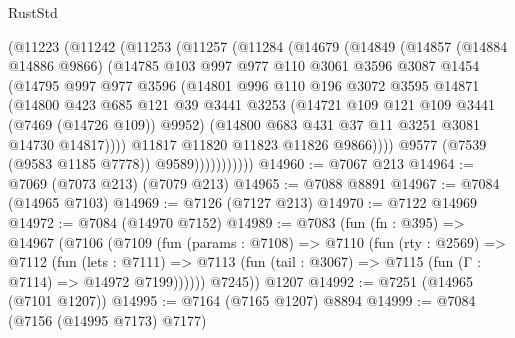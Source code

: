 \begin{lexlean}{RustStd}
\begin{coremodule}
                (@11223
                  (@11242
                    (@11253
                      (@11257
                        (@11284
                          (@14679
                            (@14849
                              (@14857
                                (@14884 @14886 @9866)
                                (@14785
                                  @103
                                  @997
                                  @977
                                  @110
                                  @3061
                                  @3596
                                  @3087
                                  @1454
                                  (@14795
                                    @997
                                    @977
                                    @3596
                                    (@14801
                                      @996
                                      @110
                                      @196
                                      @3072
                                      @3595
                                      @14871
                                      (@14800
                                        @423
                                        @685
                                        @121
                                        @39
                                        @3441
                                        @3253
                                        (@14721 @109 @121 @109 @3441 (@7469 (@14726 @109)) @9952)
                                        (@14800 @683 @431 @37 @11 @3251 @3081 @14730 @14817))))
                                  @11817
                                  @11820
                                  @11823
                                  @11826
                                  @9866))))
                          @9577
                          (@7539 (@9583 @1185 @7778))
                          @9589)))))))))))
@14960 := @7067 @213
@14964 := @7069 (@7073 @213) (@7079 @213)
@14965 := @7088 @8891
@14967 := @7084 (@14965 @7103)
@14969 := @7126 (@7127 @213)
@14970 := @7122 @14969
@14972 := @7084 (@14970 @7152)
@14989 := @7083
    (fun (fn : @395) =>
    @14967
      (@7106
        (@7109
          (fun (params : @7108) =>
          @7110
            (fun (rty : @2569) =>
            @7112
              (fun (lets : @7111) =>
              @7113 (fun (tail : @3067) => @7115 (fun (Γ : @7114) => @14972 @7199))))))
        @7245))
    @1207
@14992 := @7251 (@14965 (@7101 @1207))
@14995 := @7164 (@7165 @1207) @8894
@14999 := @7084 (@7156 (@14995 @7173) @7177)

\end{coremodule}
\end{lexlean}
